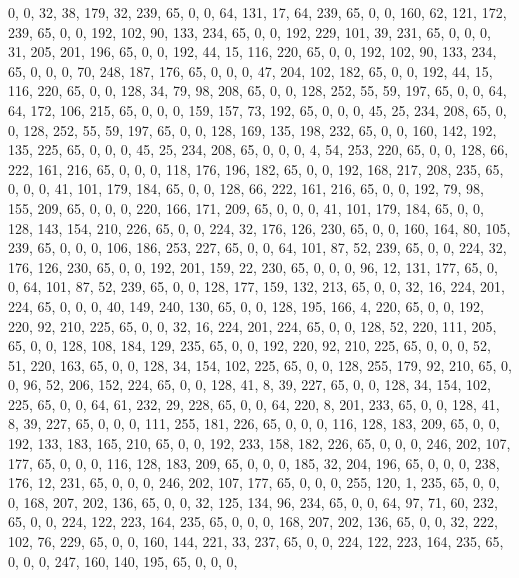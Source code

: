 \begin{DoxyCode}
       0, 0, 32, 38, 179, 32, 239, 65, 0, 0, 64, 131, 17, 64, 239, 65, 0, 0, 160, 62, 121, 172, 239, 65, 0, 0, 192,
       102, 90, 133, 234, 65, 0, 0, 192, 229, 101, 39, 231, 65, 0, 0, 0, 31, 205, 201, 196, 65, 0, 0, 192, 44, 15,
       116, 220, 65, 0, 0, 192, 102, 90, 133, 234, 65, 0, 0, 0, 70, 248, 187, 176, 65, 0, 0, 0, 47, 204, 102, 182,
       65, 0, 0, 192, 44, 15, 116, 220, 65, 0, 0, 128, 34, 79, 98, 208, 65, 0, 0, 128, 252, 55, 59, 197, 65, 0, 0,
       64, 64, 172, 106, 215, 65, 0, 0, 0, 159, 157, 73, 192, 65, 0, 0, 0, 45, 25, 234, 208, 65, 0, 0, 128, 252,
       55, 59, 197, 65, 0, 0, 128, 169, 135, 198, 232, 65, 0, 0, 160, 142, 192, 135, 225, 65, 0, 0, 0, 45, 25, 234,
       208, 65, 0, 0, 0, 4, 54, 253, 220, 65, 0, 0, 128, 66, 222, 161, 216, 65, 0, 0, 0, 118, 176, 196, 182, 65, 0,
       0, 192, 168, 217, 208, 235, 65, 0, 0, 0, 41, 101, 179, 184, 65, 0, 0, 128, 66, 222, 161, 216, 65, 0, 0, 192,
       79, 98, 155, 209, 65, 0, 0, 0, 220, 166, 171, 209, 65, 0, 0, 0, 41, 101, 179, 184, 65, 0, 0, 128, 143, 154,
       210, 226, 65, 0, 0, 224, 32, 176, 126, 230, 65, 0, 0, 160, 164, 80, 105, 239, 65, 0, 0, 0, 106, 186, 253,
       227, 65, 0, 0, 64, 101, 87, 52, 239, 65, 0, 0, 224, 32, 176, 126, 230, 65, 0, 0, 192, 201, 159, 22, 230, 65,
       0, 0, 0, 96, 12, 131, 177, 65, 0, 0, 64, 101, 87, 52, 239, 65, 0, 0, 128, 177, 159, 132, 213, 65, 0, 0, 32,
       16, 224, 201, 224, 65, 0, 0, 0, 40, 149, 240, 130, 65, 0, 0, 128, 195, 166, 4, 220, 65, 0, 0, 192, 220, 92,
       210, 225, 65, 0, 0, 32, 16, 224, 201, 224, 65, 0, 0, 128, 52, 220, 111, 205, 65, 0, 0, 128, 108, 184, 129,
       235, 65, 0, 0, 192, 220, 92, 210, 225, 65, 0, 0, 0, 52, 51, 220, 163, 65, 0, 0, 128, 34, 154, 102, 225, 65,
       0, 0, 128, 255, 179, 92, 210, 65, 0, 0, 96, 52, 206, 152, 224, 65, 0, 0, 128, 41, 8, 39, 227, 65, 0, 0, 128,
       34, 154, 102, 225, 65, 0, 0, 64, 61, 232, 29, 228, 65, 0, 0, 64, 220, 8, 201, 233, 65, 0, 0, 128, 41, 8, 39,
       227, 65, 0, 0, 0, 111, 255, 181, 226, 65, 0, 0, 0, 116, 128, 183, 209, 65, 0, 0, 192, 133, 183, 165, 210,
       65, 0, 0, 192, 233, 158, 182, 226, 65, 0, 0, 0, 246, 202, 107, 177, 65, 0, 0, 0, 116, 128, 183, 209, 65, 0,
       0, 0, 185, 32, 204, 196, 65, 0, 0, 0, 238, 176, 12, 231, 65, 0, 0, 0, 246, 202, 107, 177, 65, 0, 0, 0, 255,
       120, 1, 235, 65, 0, 0, 0, 168, 207, 202, 136, 65, 0, 0, 32, 125, 134, 96, 234, 65, 0, 0, 64, 97, 71, 60, 232,
       65, 0, 0, 224, 122, 223, 164, 235, 65, 0, 0, 0, 168, 207, 202, 136, 65, 0, 0, 32, 222, 102, 76, 229, 65, 0,
       0, 160, 144, 221, 33, 237, 65, 0, 0, 224, 122, 223, 164, 235, 65, 0, 0, 0, 247, 160, 140, 195, 65, 0, 0, 0,

\end{DoxyCode}
